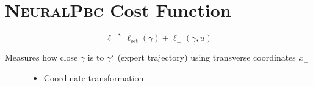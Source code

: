 \documentclass[
]{report}
\providecommand{\tightlist}{%
  \setlength{\itemsep}{0pt}\setlength{\parskip}{0pt}}\usepackage{longtable,booktabs,array}
\begin{document}
\hypertarget{neuralpbc-cost-function-2}{%
\section{\texorpdfstring{\textsc{NeuralPbc} Cost
Function}{NeuralPbc Cost Function}}\label{neuralpbc-cost-function-2}}

\[\ell \triangleq \ell_{\text{set}}(\gamma) + \ell_{\bot}(\gamma,u)\]

\begin{tcolorbox}[enhanced jigsaw, bottomrule=.15mm, arc=.35mm, colframe=quarto-callout-color-frame, breakable, leftrule=.75mm, rightrule=.15mm, colback=white, toprule=.15mm, left=2mm, opacityback=0]

Measures how close \(\gamma\) is to \(\gamma^\star\) (expert trajectory)
using transverse coordinates \(x_\bot\)

\begin{figure}

\begin{minipage}[t]{0.41\linewidth}

{\centering 


}

\end{minipage}%
%
\begin{minipage}[t]{0.59\linewidth}

{\centering 

\begin{itemize}
\tightlist
\item
  Coordinate transformation


\end{itemize}}
\end{minipage}
\end{figure}
\end{tcolorbox}
\end{document}

